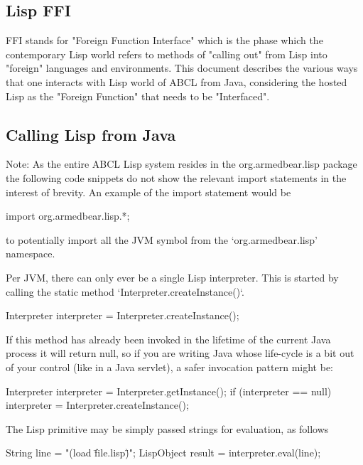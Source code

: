\documentclass[10pt]{book}
\begin{document}
\subsection{Lisp FFI}

FFI stands for "Foreign Function Interface" which is the phase which
the contemporary Lisp world refers to methods of "calling out" from
Lisp into "foreign" languages and environments.  This document
describes the various ways that one interacts with Lisp world of ABCL
from Java, considering the hosted Lisp as the "Foreign Function" that
needs to be "Interfaced".

\subsection{Calling Lisp from Java}

Note: As the entire ABCL Lisp system resides in the org.armedbear.lisp
package the following code snippets do not show the relevant import
statements in the interest of brevity.  An example of the import
statement would be

\begin{listing-java}
  import org.armedbear.lisp.*;
\end{listing-java}

to potentially import all the JVM symbol from the `org.armedbear.lisp'
namespace.

Per JVM, there can only ever be a single Lisp interpreter.  This is
started by calling the static method `Interpreter.createInstance()`.

\begin{listing-java}
  Interpreter interpreter = Interpreter.createInstance();
\end{listing-java}

If this method has already been invoked in the lifetime of the current
Java process it will return null, so if you are writing Java whose
life-cycle is a bit out of your control (like in a Java servlet), a
safer invocation pattern might be:

\begin{listing-java}
  Interpreter interpreter = Interpreter.getInstance();
  if (interpreter == null) {
    interpreter = Interpreter.createInstance();
  }
\end{listing-java}


The Lisp  primitive may be simply passed strings for evaluation,
as follows

\begin{listing-java}
  String line = "(load \"file.lisp\")";
  LispObject result = interpreter.eval(line);
\end{listing-java}
\end{document}
